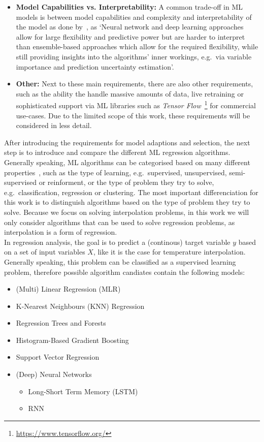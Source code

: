 \begin{itemize}
    \item \textbf{Model Capabilities vs. Interpretability:} A common trade-off in ML models is between model capabilities and complexity and interpretability of the model as done by~\cite{zumwald2021mapping}, as `Neural network and deep learning approaches allow for large flexibility and predictive power but are harder to interpret than ensemble-based approaches which allow for the required flexibility, while still providing insights into the algorithms' inner workings, e.g.\ via variable importance and prediction uncertainty estimation'.
    \item \textbf{Other:} Next to these main requirements, there are also other requirements, such as the ability the handle massive amounts of data, live retraining or sophisticated support via ML libraries such as \textit{Tensor Flow}~\footnote{\url{https://www.tensorflow.org/}} for commercial use-cases. Due to the limited scope of this work, these requirements will be considered in less detail.
\end{itemize}

After introducing the requirements for model adaptions and selection, the next step is to introduce and compare the different ML regression algorithms.
Generally speaking, ML algorithms can be categorised based on many different properties~\cite{sarker2021machine}, such as the type of learning, e.g.\ supervised, unsupervised, semi-supervised or reinforment, or the type of problem they try to solve, e.g.\ classification, regression or clustering. The most important differenciation for this work is to distinguish algorithms based on the type of problem they try to solve. Because we focus on solving interpolation problems, in this work we will only consider algorithms that can be used to solve regression problems, as interpolation is a form of regression.\\
In regression analysis, the goal is to predict a (continous) target variable $y$ based on a set of input variables $X$, like it is the case for temperature interpolation. Generally speaking, this problem can be classified as a supervised learning problem, therefore possible algorithm candiates contain the following models:

\begin{itemize}
    \item (Multi) Linear Regression (MLR)
    \item K-Nearest Neighbours (KNN) Regression
    \item Regression Trees and Forests
    \item Histogram-Based Gradient Boosting
    \item Support Vector Regression
    \item (Deep) Neural Networks

    \begin{itemize}
        \item Long-Short Term Memory (LSTM)
        \item RNN
    \end{itemize}
\end{itemize}

